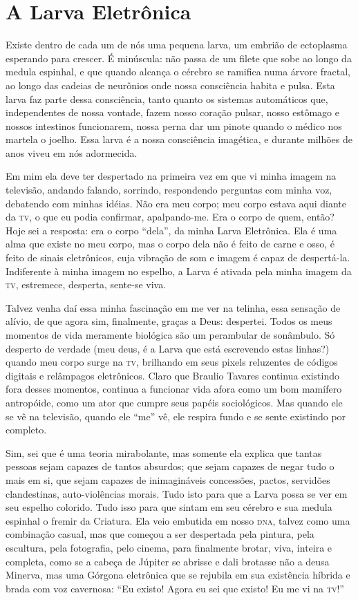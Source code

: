 \chapter{A Larva Eletrônica}

Existe dentro de cada um de nós uma pequena larva, um embrião de
ectoplasma esperando para crescer. É minúscula: não passa de um
filete que sobe ao longo da medula espinhal, e que quando alcança o
cérebro se ramifica numa árvore fractal, ao longo das cadeias de
neurônios onde nossa consciência habita e pulsa.  Esta larva faz
parte dessa consciência, tanto quanto os sistemas automáticos que,
independentes de nossa vontade, fazem nosso coração pulsar, nosso
estômago e nossos intestinos funcionarem, nossa perna dar um pinote
quando o médico nos martela o joelho. Essa larva é a nossa
consciência imagética, e durante milhões de anos viveu em nós
adormecida.

Em mim ela deve ter despertado na primeira vez em que vi minha imagem
na televisão, andando falando, sorrindo, respondendo perguntas com
minha voz, debatendo com minhas idéias. Não era meu corpo; meu corpo
estava aqui diante da \textsc{tv}, o que eu podia confirmar, apalpando-me. Era
o corpo de quem, então? Hoje sei a resposta: era o corpo “dela”, da
minha Larva Eletrônica. Ela é uma alma que existe no meu corpo, mas o
corpo dela não é feito de carne e osso, é feito de sinais
eletrônicos, cuja vibração de som e imagem é capaz de despertá-la.
Indiferente à minha imagem no espelho, a Larva é ativada pela minha
imagem da \textsc{tv}, estremece, desperta, sente-se viva. 

Talvez venha daí essa minha fascinação em me ver na telinha, essa
sensação de alívio, de que agora sim, finalmente, graças a Deus:
despertei. Todos os meus momentos de vida meramente biológica são um
perambular de sonâmbulo. Só desperto de verdade (meu deus, é a Larva
que está escrevendo estas linhas?) quando meu corpo surge na \textsc{tv},
brilhando em seus pixels reluzentes de códigos digitais e relâmpagos
eletrônicos. Claro que Braulio Tavares continua existindo fora desses
momentos, continua a funcionar vida afora como um bom mamífero
antropóide, como um ator que cumpre seus papéis sociológicos. Mas
quando ele se vê na televisão, quando ele “me” vê, ele respira fundo
e se sente existindo por completo.

Sim, sei que é uma teoria mirabolante, mas somente ela explica que
tantas pessoas sejam capazes de tantos absurdos; que sejam capazes de
negar tudo o mais em si, que sejam capazes de inimagináveis
concessões, pactos, servidões clandestinas, auto-violências morais.
Tudo isto para que a Larva possa se ver em seu espelho colorido. Tudo
isso para que sintam em seu cérebro e sua medula espinhal o fremir da
Criatura. Ela veio embutida em nosso \textsc{dna}, talvez como uma combinação
casual, mas que começou a ser despertada pela pintura, pela
escultura, pela fotografia, pelo cinema, para finalmente brotar,
viva, inteira e completa, como se a cabeça de Júpiter se abrisse e
dali brotasse não a deusa Minerva, mas uma Górgona eletrônica que se
rejubila em sua existência híbrida e brada com voz cavernosa: “Eu
existo! Agora eu sei que existo! Eu me vi na \textsc{tv}!”

